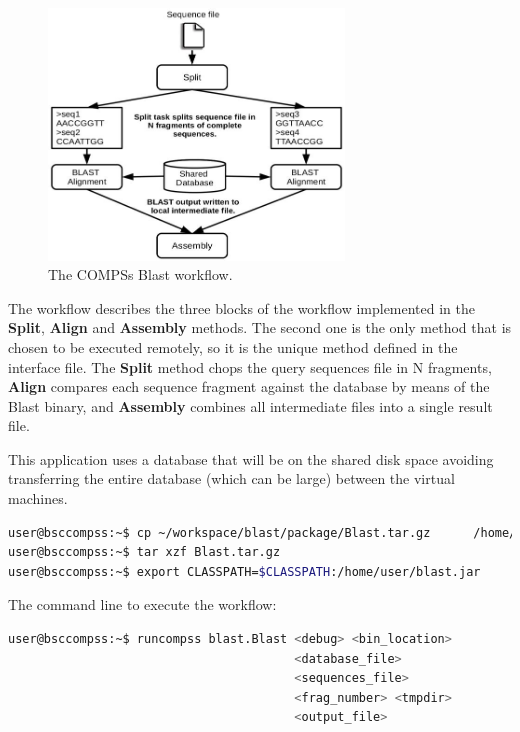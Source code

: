 \begin{figure}[ht!]
  \centering
    \includegraphics[width=0.7\textwidth]{./Sections/4_Sample_Apps/Figures/blast_workflow.jpeg}
    \caption{The COMPSs Blast workflow. \label{fig:BLAST_workflow}}
\end{figure}

The workflow describes the three blocks of the workflow implemented in the {\bf Split}, {\bf Align} and {\bf Assembly} methods. The second one is the only method that is chosen to be executed remotely, so it is the unique method defined in the interface file. The {\bf Split} method chops the query sequences file in N fragments, {\bf Align} compares each sequence fragment against the database by means of the Blast binary, and {\bf Assembly} combines all intermediate files into a single result file.

This application uses a database that will be on the shared disk space avoiding transferring the entire database (which can be large) between the virtual machines.

\begin{lstlisting}[language=bash]
user@bsccompss:~$ cp ~/workspace/blast/package/Blast.tar.gz      /home/user/
user@bsccompss:~$ tar xzf Blast.tar.gz
user@bsccompss:~$ export CLASSPATH=$CLASSPATH:/home/user/blast.jar
\end{lstlisting}

The command line to execute the workflow:

\begin{lstlisting}[language=bash]
user@bsccompss:~$ runcompss blast.Blast <debug> <bin_location>
                                        <database_file> 
                                        <sequences_file>
                                        <frag_number> <tmpdir>
                                        <output_file>
\end{lstlisting}

